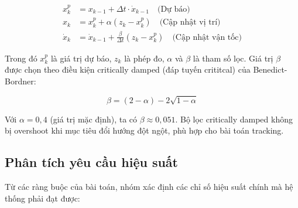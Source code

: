 \begin{equation}
\begin{aligned}
x_{k}^{p} &= x_{k-1} + \Delta t \cdot \dot{x}_{k-1} \quad \text{(Dự báo)} \\
x_{k} &= x_{k}^{p} + \alpha (z_{k} - x_{k}^{p}) \quad \text{(Cập nhật vị trí)} \\
\dot{x}_{k} &= \dot{x}_{k-1} + \frac{\beta}{\Delta t} (z_{k} - x_{k}^{p}) \quad \text{(Cập nhật vận tốc)}
\end{aligned}
\end{equation}

Trong đó $x_k^p$ là giá trị dự báo, $z_k$ là phép đo, $\alpha$ và $\beta$ là tham số lọc. Giá trị $\beta$ được chọn theo điều kiện critically damped (đáp tuyến crititcal) của Benedict-Bordner:

\begin{equation}
\beta = (2 - \alpha) - 2\sqrt{1 - \alpha}
\end{equation}

Với $\alpha = 0{,}4$ (giá trị mặc định), ta có $\beta \approx 0{,}051$. Bộ lọc critically damped không bị overshoot khi mục tiêu đổi hướng đột ngột, phù hợp cho bài toán tracking.

\subsection{Phân tích yêu cầu hiệu suất}

\hspace{0.5cm} Từ các ràng buộc của bài toán, nhóm xác định các chỉ số hiệu suất chính mà hệ thống phải đạt được:

\begin{table}[H]
\centering
\caption{Các chỉ số hiệu suất thiết kế của hệ thống}
\label{tab:performance-spec}
\end{table}


